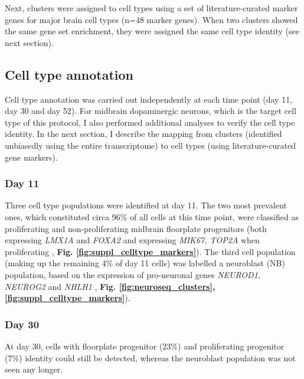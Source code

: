 Next, clusters were assigned to cell types using a set of literature-curated marker genes for major brain cell types (n=48 marker genes). 
When two clusters showed the same gene set enrichment, they were assigned the same cell type identity (see next section).

\subsection{Cell type annotation}
Cell type annotation was carried out independently at each time point (day 11, day 30 and day 52).
For midbrain dopaminergic neurons, which is the target cell type of this protocol, I also performed additional analyses to verify the cell type identity.
In the next section, I describe the mapping from clusters (identified unbiasedly using the entire transcriptome) to cell types (using literature-curated gene markers).

\subsubsection{Day 11}

Three cell type populations were identified at day 11.
The two most prevalent ones, which constituted circa 96\% of all cells at this time point, were classified as proliferating and non-proliferating midbrain floorplate progenitors (both expressing \textit{LMX1A} and \textit{FOXA2} and expressing \textit{MIK67, TOP2A} when proliferating \cite{la2016molecular}, \textbf{Fig. \ref{fig:suppl_celltype_markers}}).
The third cell population (making up the remaining 4\% of day 11 cells) was labelled a neuroblast (NB) population, based on the expression of pro-neuronal genes \textit{NEUROD1}, \textit{NEUROG2} and \textit{NHLH1} \cite{bertrand2002proneural, lacomme2012neurog2}, \textbf{Fig. \ref{fig:neuroseq_clusters}, \ref{fig:suppl_celltype_markers}}).

\subsubsection{Day 30}

At day 30, cells with floorplate progenitor (23\%) and proliferating progenitor (7\%) identity could still be detected, whereas the neuroblast population was not seen any longer.


